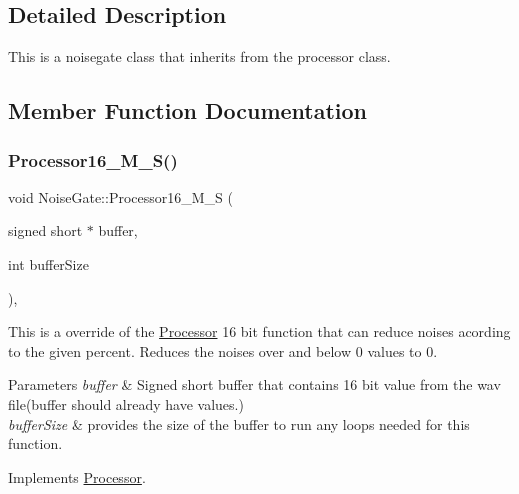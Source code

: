 \subsection{Detailed Description}
This is a noisegate class that inherits from the processor class. 

\subsection{Member Function Documentation}
\mbox{\label{classNoiseGate_a8e1f9ab7c18b029fdae17ec621ac91d0}} 
\subsubsection{\texorpdfstring{Processor16\+\_\+\+M\+\_\+\+S()}{Processor16\_M\_S()}}
{\footnotesize\ttfamily void Noise\+Gate\+::\+Processor16\+\_\+\+M\+\_\+S (\begin{DoxyParamCaption}\item[{signed short $\ast$}]{buffer,  }\item[{int}]{buffer\+Size }\end{DoxyParamCaption})\hspace{0.3cm}{\ttfamily [override]}, {\ttfamily [virtual]}}



This is a override of the \hyperlink{classProcessor}{Processor} 16 bit function that can reduce noises acording to the given percent. Reduces the noises over and below 0 values to 0. 


\begin{DoxyParams}{Parameters}
{\em buffer} & Signed short buffer that contains 16 bit value from the wav file(buffer should already have values.) \\
\hline
{\em buffer\+Size} & provides the size of the buffer to run any loops needed for this function. \\
\hline
\end{DoxyParams}


Implements \hyperlink{classProcessor}{Processor}.

\mbox{\label{classNoiseGate_afbf50fc4dce474a9f588696756b7e1ad}} 
